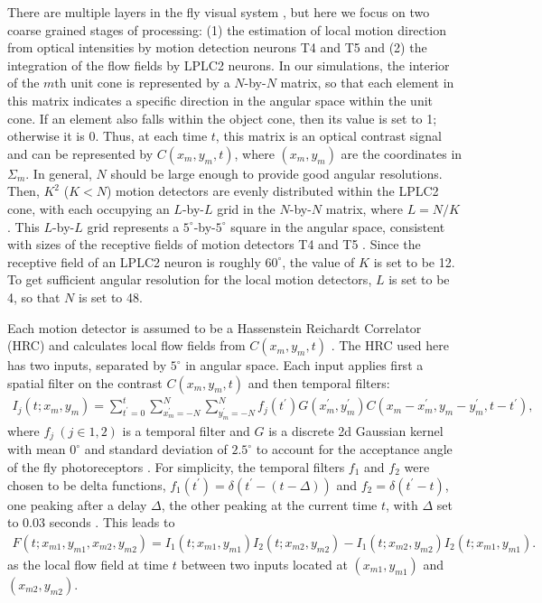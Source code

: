 \documentclass[pdftex,9pt,lineno]{elife}
\begin{document}
There are multiple layers in the fly visual system \citep{takemura2017comprehensive}, but here we focus on two coarse grained stages of processing: (1) the estimation of local motion direction from optical intensities by motion detection neurons T4 and T5 and (2) the integration of the flow fields by LPLC2 neurons. In our simulations, the interior of the $m$th unit cone is represented by a $N$-by-$N$ matrix, so that each element in this matrix indicates a specific direction in the angular space within the unit cone. If an element also falls within the object cone, then its value is set to 1; otherwise it is 0. Thus, at each time $t$, this matrix is an optical contrast signal and can be represented by $C(x_{m},y_{m},t)$, where $(x_{m},y_{m})$ are the coordinates in $\Sigma_{m}$. In general, $N$ should be large enough to provide good angular resolutions. Then, $K^{2}$ ($K<N$) motion detectors are evenly distributed within the LPLC2 cone, with each occupying an $L$-by-$L$ grid in the $N$-by-$N$ matrix, where $L=N/K$. This $L$-by-$L$ grid represents a $5^{\circ}$-by-$5^{\circ}$ square in the angular space, consistent with sizes of the receptive fields of motion detectors T4 and T5 \citep{zavatone2020minimal}. Since the receptive field of an LPLC2 neuron is roughly $60^{\circ}$, the value of $K$ is set to be 12. To get sufficient angular resolution for the local motion detectors, $L$ is set to be 4, so that $N$ is set to 48.

Each motion detector is assumed to be a Hassenstein Reichardt Correlator (HRC) and calculates local flow fields from $C(x_{m},y_{m},t)$ \citep{hassenstein1956systemtheoretische}. The HRC used here has two inputs, separated by $5^{\circ}$ in angular space. Each input applies first a spatial filter on the contrast $C(x_{m},y_{m},t)$ and then temporal filters:
\begin{align}
I_{j}(t;x_{m},y_{m}) = \sum_{t^{'}=0}^{t}\sum_{x^{'}_{m}=-N}^{N}\sum_{y^{'}_{m}=-N}^{N}f_{j}(t^{'})G(x^{'}_{m},y^{'}_{m})C(x_{m}-x^{'}_{m},y_{m}-y^{'}_{m},t-t^{'}),
\end{align}
where $f_{j}\ (j \in {1,2})$ is a temporal filter and $G$ is a discrete 2d Gaussian kernel with mean $0^{\circ}$ and standard deviation of $2.5^{\circ}$ to account for the acceptance angle of the fly photoreceptors \citep{stavenga2003angular}. For simplicity, the temporal filters $f_{1}$ and $f_{2}$ were chosen to be delta functions, $f_{1}(t^{'})=\delta (t^{'}-(t-\Delta))$ and $f_{2}=\delta (t^{'}-t)$, one peaking after a delay $\Delta$, the other peaking at the current time $t$, with $\Delta$ set to 0.03 seconds \citep{salazar2016direct}. This leads to
\begin{align}\label{eq:HRC}
F(t;x_{m1},y_{m1},x_{m2},y_{m2}) = I_{1}(t;x_{m1},y_{m1})I_{2}(t;x_{m2},y_{m2})-I_{1}(t;x_{m2},y_{m2})I_{2}(t;x_{m1},y_{m1}).
\end{align}
as the local flow field at time $t$ between two inputs located at $(x_{m1},y_{m1})$ and $(x_{m2},y_{m2})$.
\end{document}
